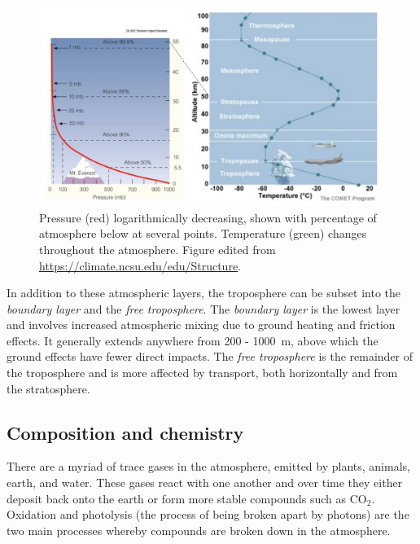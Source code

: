     \begin{figure}
      \includegraphics[width=\textwidth]{Figures/Atmos_Temp_Press.jpg}
      \caption{%
        Pressure (red) logarithmically decreasing, shown with percentage of atmosphere below at several points.
        Temperature (green) changes throughout the atmosphere.
        Figure edited from \url{https://climate.ncsu.edu/edu/Structure}.
      }
      \label{LR:Atmos:Struct:Fig_atmos_layers}
    \end{figure}
    
    
    
    In addition to these atmospheric layers, the troposphere can be subset into the \textit{boundary layer} and the \textit{free troposphere}.
    The \textit{boundary layer} is the lowest layer and involves increased atmospheric mixing due to ground heating and friction effects.
    It generally extends anywhere from 200 - 1000~m, above which the ground effects have fewer direct impacts.
    The \textit{free troposphere} is the remainder of the troposphere and is more affected by transport, both horizontally and from the stratosphere.
    
    
  \subsection{Composition and chemistry}
  \label{LR:Atmos:Chem}
        
    There are a myriad of trace gases in the atmosphere, emitted by plants, animals, earth, and water. 
    These gases react with one another and over time they either deposit back onto the earth or form more stable compounds such as CO$_2$.
    Oxidation and photolysis (the process of being broken apart by photons) are the two main processes whereby compounds are broken down in the atmosphere.
    
